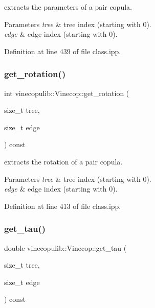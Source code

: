 extracts the parameters of a pair copula. 


\begin{DoxyParams}{Parameters}
{\em tree} & tree index (starting with 0). \\
\hline
{\em edge} & edge index (starting with 0). \\
\hline
\end{DoxyParams}


Definition at line 439 of file class.\+ipp.

\mbox{\label{classvinecopulib_1_1_vinecop_a889a0c1c5c143e32cf34aa9bd15e33b6}} 
\subsubsection{\texorpdfstring{get\+\_\+rotation()}{get\_rotation()}}
{\footnotesize\ttfamily int vinecopulib\+::\+Vinecop\+::get\+\_\+rotation (\begin{DoxyParamCaption}\item[{size\+\_\+t}]{tree,  }\item[{size\+\_\+t}]{edge }\end{DoxyParamCaption}) const\hspace{0.3cm}{\ttfamily [inline]}}



extracts the rotation of a pair copula. 


\begin{DoxyParams}{Parameters}
{\em tree} & tree index (starting with 0). \\
\hline
{\em edge} & edge index (starting with 0). \\
\hline
\end{DoxyParams}


Definition at line 413 of file class.\+ipp.

\mbox{\label{classvinecopulib_1_1_vinecop_a3f4cc62395a9ae4ce2b7714ceae6bde3}} 
\subsubsection{\texorpdfstring{get\+\_\+tau()}{get\_tau()}}
{\footnotesize\ttfamily double vinecopulib\+::\+Vinecop\+::get\+\_\+tau (\begin{DoxyParamCaption}\item[{size\+\_\+t}]{tree,  }\item[{size\+\_\+t}]{edge }\end{DoxyParamCaption}) const\hspace{0.3cm}{\ttfamily [inline]}}



